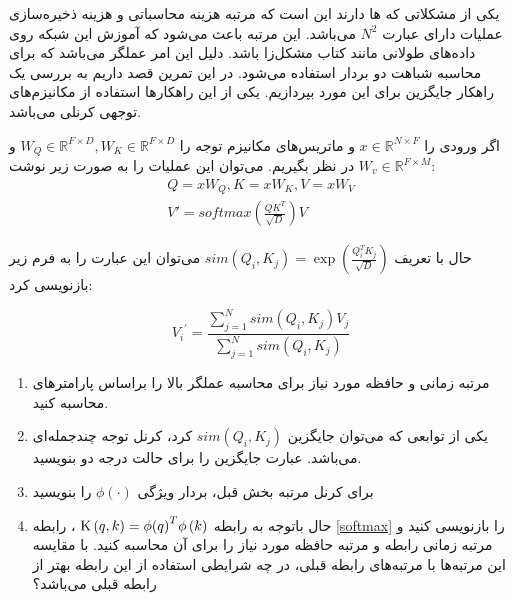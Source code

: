 یکی از مشکلاتی که
ها دارند این است که مرتبه هزینه محاسباتی و هزینه ذخیره‌سازی عملیات
دارای عبارت
$N^2$
می‌باشد. این مرتبه باعث می‌شود که آموزش این شبکه روی داده‌های طولانی مانند کتاب مشکل‌زا باشد. دلیل این امر عملگر
می‌باشد که برای محاسبه شباهت دو بردار استفاده می‌شود. در این تمرین قصد داریم به بررسی یک راهکار جایگزین برای این مورد بپردازیم. یکی از این راهکار‌ها استفاده از مکانیزم‌های توجهی کرنلی می‌باشد.

اگر ورودی را
$x \in {\mathbb{R}^{N \times F}}$
و ماتریس‌های مکانیزم توجه را
${W_Q} \in {\mathbb{R}^{F \times D}},{W_K} \in {\mathbb{R}^{F \times D}}$
و
${W_v} \in {\mathbb{R}^{F \times M}}$
در نظر بگیریم. می‌توان این عملیات را به صورت زیر نوشت:
$$
\begin{array}{l}
	Q = x{W_Q},K = x{W_K},V = x{W_V}\\
	V' = softmax \left( {\frac{{Q{K^T}}}{{\sqrt D }}} \right)V
\end{array}
 $$
 
 حال با تعریف
 $sim\left( {{Q_i},{K_j}} \right) = \exp \left( {\frac{{Q_i^T{K_j}}}{{\sqrt D }}} \right)$
 می‌توان این عبارت را به فرم زیر بازنویسی کرد:
 
\begin{equation} \label{softmax}
	{V_i}^\prime  = \frac{{\sum\limits_{j = 1}^N {sim\left( {{Q_i},{K_j}} \right){V_j}} }}{{\sum\limits_{j = 1}^N {sim\left( {{Q_i},{K_j}} \right)} }}
\end{equation}
 
\begin{enumerate}[label=(\alph*)]
	\item
	مرتبه زمانی و حافظه مورد نیاز برای محاسبه عملگر
	بالا را براساس پارامتر‌های
	محاسبه کنید.
	
	\item
	یکی از توابعی که می‌توان جایگزین
	$sim\left( {{Q_i},{K_j}} \right)$
	کرد، کرنل توجه چند‌جمله‌ای می‌باشد. عبارت جایگزین را برای حالت درجه دو
	بنویسید.
	\item
	برای کرنل مرتبه بخش قبل، بردار ویژگی
	$\phi \left(  \cdot  \right)$
	را بنویسید
	\item
	حال باتوجه به رابطه
	${\rm K}\left( {q,k} \right) = \phi {\left( q \right)^T}\phi \left( k \right)$
	، رابطه
	\ref{softmax}
	را بازنویسی کنید و مرتبه زمانی رابطه و مرتبه حافظه مورد نیاز را برای آن محاسبه کنید. با مقایسه این مرتبه‌ها با مرتبه‌های رابطه قبلی، در چه شرایطی استفاده از این رابطه بهتر از رابطه قبلی می‌باشد؟
	
\end{enumerate}